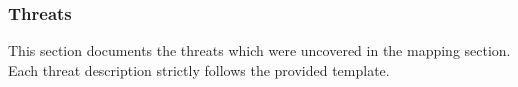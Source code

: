 \subsubsection{Threats}
This section documents the threats which were uncovered in the mapping section.
Each threat description strictly follows the provided template.

%




%








